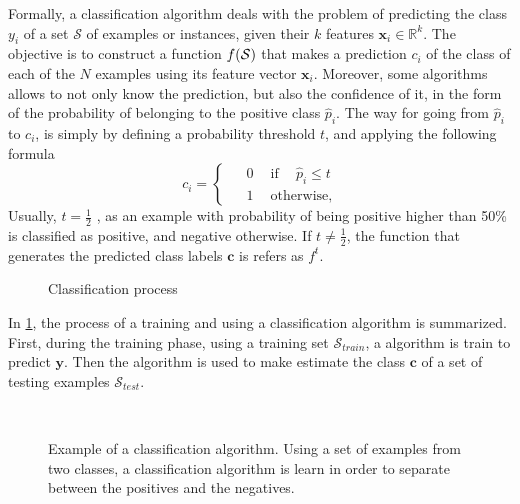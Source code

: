 Formally, a classification algorithm deals with the problem	of predicting the class $y_i$ of a 
set $\mathcal{S}$ of examples or instances, given their $k$ features \mbox{$\mathbf{x}_i \in 
\mathbb{R}^k$}. The objective is to construct a function $f(\cal{S})$ that makes a prediction 
$c_i$ of the class of each of the $N$ examples using its feature vector $\mathbf{x}_i$.
Moreover, some algorithms allows to not only know the prediction, but also the confidence of it, in 
the form of the probability of belonging to the positive class $\hat p_i$. The way for going from 
$\hat p_i$ to $c_i$, is simply by defining a probability threshold $t$, and applying the following 
formula
\begin{equation}\label{eq_pred}
  c_i = 
  \begin{cases}
    \phantom{-}0 \phantom{-} \mbox{if} \phantom{-} \hat p_i \le t\\
    \phantom{-}1 \phantom{-}\mbox{otherwise,}
  \end{cases}
\end{equation}
Usually, $t=\frac{1}{2}$ \citep{Hastie2009}, as an example with probability of being positive 
higher than 50\% is classified as positive, and negative otherwise. If $t \ne \frac{1}{2}$, the 
function that generates the predicted class labels $\mathbf{c}$ is refers as $f^t$.

\begin{figure}
	\centering
	
  \caption{Classification process}
  \label{fig:2:1}
\end{figure}

In \figurename{ \ref{fig:2:1}}, the process of a training and using a classification algorithm is 
summarized. First, during the training phase, using a training set $\mathcal{S}_{train}$, a 
algorithm is train to predict $\mathbf{y}$. Then the algorithm is used to make estimate the class 
$\mathbf{c}$ of a set of testing examples $\mathcal{S}_{test}$.

\begin{figure}[!t]
\centering
{}
\\
\caption{Example of a classification algorithm. Using a set of examples from two classes, a 
	classification algorithm is learn in order to separate between the positives and the negatives. }
\label{fig:2:2}
\end{figure} 


